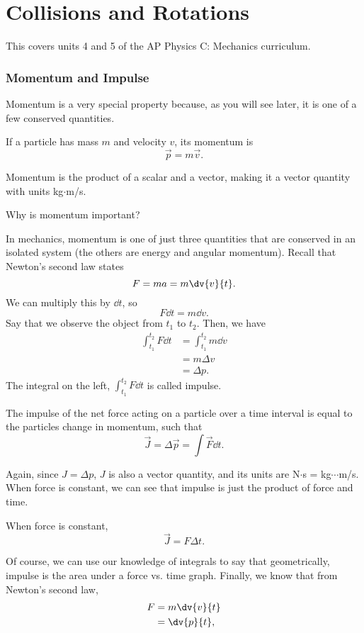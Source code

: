 \documentclass[11pt]{article}
\begin{document}
\newpage

\part{Collisions and Rotations}
This covers units 4 and 5 of the AP Physics C: Mechanics curriculum.
\section{Momentum and Impulse}
Momentum is a very special property because, as you will see later, it is one of a few conserved quantities.
\begin{defn}
	If a particle has mass $m$ and velocity $v$, its momentum is
	\[\vec{p} = m\vec{v}.\]
\end{defn}
Momentum is the product of a scalar and a vector, making it a vector quantity with units kg$\cdot$m/s.
\begin{question}
	Why is momentum important?
\end{question}
In mechanics, momentum is one of just three quantities that are conserved in an isolated system (the others are energy and angular momentum). Recall that Newton's second law states
\[F = ma = m\dv{v}{t}.\]
We can multiply this by $\dd t$, so
\[F\dd t = m \dd v.\]
Say that we observe the object from $t_1$ to $t_2$. Then, we have
\begin{align*}
	\int_{t_1}^{t_2} F \dd t &= \int_{t_1}^{t_2} m \dd v \\
	&= m\Delta v \\
	&= \Delta p.
\end{align*}
The integral on the left, $\int_{t_1}^{t_2} F \dd t$ is called impulse.
\begin{defn}
	The impulse of the net force acting on a particle over a time interval is equal to the particles change in momentum, such that
	\[\vec{J} = \Delta \vec{p} = \int \vec{F} \dd t.\]
\end{defn}
Again, since $J = \Delta p$, $J$ is also a vector quantity, and its units are N$\cdot$s = kg$\cdots$m/s. When force is constant, we can see that impulse is just the product of force and time.
\begin{eqn}
	When force is constant,
	\[\vec{J} = F\Delta t.\]
\end{eqn}
Of course, we can use our knowledge of integrals to say that geometrically, impulse is the area under a force vs. time graph. Finally, we know that from Newton's second law,
\begin{align*}
	F &= m\dv{v}{t} \\
	&= \dv{p}{t},
\end{align*}
\end{document}
